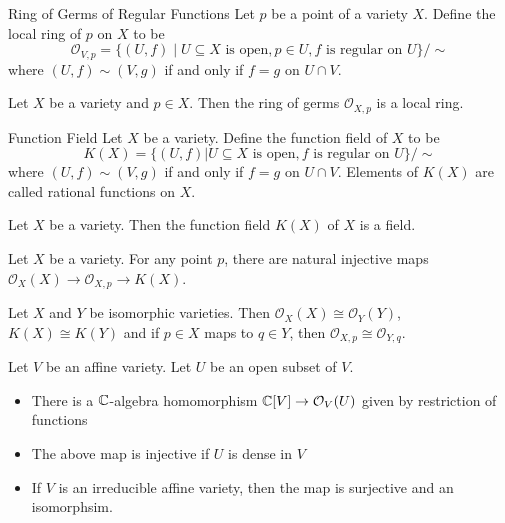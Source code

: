 \documentclass[a4paper]{article}
\begin{document}
\begin{defn}{Ring of Germs of Regular Functions}{} Let $p$ be a point of a variety $X$. Define the local ring of $p$ on $X$ to be $$\mathcal{O}_{V,p}=\{(U,f)\;|\;U\subseteq X\text{ is open}, p\in U, f\text{ is regular on }U\}/\sim$$ where $(U,f)\sim(V,g)$ if and only if $f=g$ on $U\cap V$. 
\end{defn}

\begin{prp}{}{} Let $X$ be a variety and $p\in X$. Then the ring of germs $\mathcal{O}_{X,p}$ is a local ring. 
\end{prp}

\begin{defn}{Function Field}{} Let $X$ be a variety. Define the function field of $X$ to be $$K(X)=\{(U,f)|U\subseteq X\text{ is open}, f\text{ is regular on }U\}/\sim$$ where $(U,f)\sim(V,g)$ if and only if $f=g$ on $U\cap V$. Elements of $K(X)$ are called rational functions on $X$. 
\end{defn}

\begin{lmm}{}{} Let $X$ be a variety. Then the function field $K(X)$ of $X$ is a field. 
\end{lmm}

\begin{lmm}{}{} Let $X$ be a variety. For any point $p$, there are natural injective maps $\mathcal{O}_X(X)\to\mathcal{O}_{X,p}\to K(X)$. 
\end{lmm}

\begin{prp}{}{} Let $X$ and $Y$ be isomorphic varieties. Then $\mathcal{O}_X(X)\cong\mathcal{O}_Y(Y)$, $K(X)\cong K(Y)$ and if $p\in X$ maps to $q\in Y$, then $\mathcal{O}_{X,p}\cong\mathcal{O}_{Y,q}$. 
\end{prp}

\begin{thm}{}{} Let $V$ be an affine variety. Let $U$ be an open subset of $V$. 
\begin{itemize}
\item There is a $\mathbb{C}$-algebra homomorphism $\mathbb{C}[V]\to\mathcal{O}_V(U)$ given by restriction of functions
\item The above map is injective if $U$ is dense in $V$
\item If $V$ is an irreducible affine variety, then the map is surjective and an isomorphsim. 
\end{itemize}
\end{thm}
\end{document}
